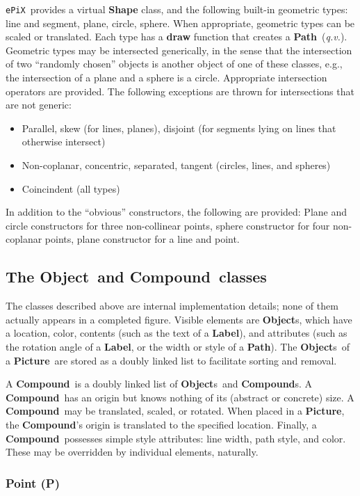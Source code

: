 \documentclass[12pt]{article}
\newcommand{\Class}[1]{\textbf{#1}}
\newcommand{\Program}[1]{\texttt{#1}}
\newcommand{\Compound}{\Class{Compound}}
\newcommand{\Compounds}{\Class{Compound}s}
\newcommand{\Label}{\Class{Label}}
\newcommand{\Object}{\Class{Object}}
\newcommand{\Objects}{\Class{Object}s}
\newcommand{\Path}{\Class{Path}}
\newcommand{\Picture}{\Class{Picture}}
\newcommand{\ePiX}{\Program{ePiX}}
\newcommand{\bi}{\begin{itemize}}
\newcommand{\ei}{\end{itemize}}
\begin{document}
\ePiX\ provides a virtual \Class{Shape} class, and the following
built-in geometric types: line and segment, plane, circle, sphere.
When appropriate, geometric types can be scaled or translated. Each
type has a \textbf{draw} function that creates a \Path\ (\emph{q.v.}).
Geometric types may be intersected generically, in the sense that the
intersection of two ``randomly chosen'' objects is another object of
one of these classes, e.g., the intersection of a plane and a sphere
is a circle. Appropriate intersection operators are provided. The
following exceptions are thrown for intersections that are not
generic:

\bi
  \item Parallel, skew (for lines, planes), disjoint (for segments
  lying on lines that otherwise intersect)

  \item Non-coplanar, concentric, separated, tangent (circles, lines,
    and spheres)

  \item Coincindent (all types)
\ei

In addition to the ``obvious'' constructors, the following are
provided: Plane and circle constructors for three non-collinear
points, sphere constructor for four non-coplanar points, plane
constructor for a line and point.


\subsection{The \Object\ and \Compound\ classes}

The classes described above are internal implementation details; none
of them actually appears in a completed figure.  Visible elements are
\Objects, which have a location, color, contents (such as the text of
a \Label), and attributes (such as the rotation angle of a \Label, or
the width or style of a \Path). The \Objects\ of a \Picture\ are
stored as a doubly linked list to facilitate sorting and removal.

A \Compound\ is a doubly linked list of \Objects~and \Compounds. A
\Compound\ has an origin but knows nothing of its (abstract or
concrete) size. A \Compound\ may be translated, scaled, or rotated.
When placed in a \Picture, the \Compound's origin is translated to the
specified location. Finally, a \Compound\ possesses simple style
attributes: line width, path style, and color. These may be overridden
by individual elements, naturally.

\subsubsection*{Point (P)}
\end{document}
